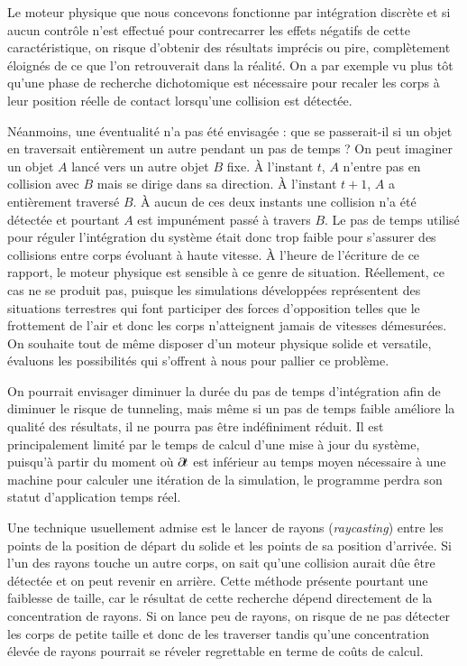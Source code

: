 Le moteur physique que nous concevons fonctionne par intégration
discrète et si aucun contrôle n'est effectué pour contrecarrer les
effets négatifs de cette caractéristique, on risque d'obtenir des
résultats imprécis ou pire, complètement éloignés de ce que l'on
retrouverait dans la réalité. On a par exemple vu plus tôt qu'une
phase de recherche dichotomique est nécessaire pour recaler les corps
à leur position réelle de contact lorsqu'une collision est détectée.

Néanmoins, une éventualité n'a pas été envisagée : que se passerait-il
si un objet en traversait entièrement un autre pendant un pas de temps
? On peut imaginer un objet $A$ lancé vers un autre objet $B$
fixe. \`A l'instant $t$, $A$ n'entre pas en collision avec $B$ mais se
dirige dans sa direction. \`A l'instant $t+1$, $A$ a entièrement
traversé $B$. \`A aucun de ces deux instants une collision n'a été
détectée et pourtant $A$ est impunément passé à travers $B$. Le pas de
temps utilisé pour réguler l'intégration du système était donc trop
faible pour s'assurer des collisions entre corps évoluant à haute
vitesse. \`A l'heure de l'écriture de ce rapport, le moteur physique
est sensible à ce genre de situation. Réellement, ce cas ne se produit
pas, puisque les simulations développées représentent des situations
terrestres qui font participer des forces d'opposition telles que le
frottement de l'air et donc les corps n'atteignent jamais de vitesses
démesurées. On souhaite tout de même disposer d'un moteur physique
solide et versatile, évaluons les possibilités qui s'offrent à nous
pour pallier ce problème.

\begin{figure}
  \centering
  
  \caption{}
  \label{tunneling1}
\end{figure}

On pourrait envisager diminuer la durée du pas de temps d'intégration
afin de diminuer le risque de tunneling, mais même si un pas de temps
faible améliore la qualité des résultats, il ne pourra pas être
indéfiniment réduit. Il est principalement limité par le temps de
calcul d'une mise à jour du système, puisqu'à partir du moment o\`u
$\partial \! t$ est inférieur au temps moyen nécessaire à une machine pour
calculer une itération de la simulation, le programme perdra son
statut d'application temps réel.

Une technique usuellement admise est le lancer de rayons
(\textit{raycasting}) entre les points de la position de départ du
solide et les points de sa position d'arrivée. Si l'un des rayons
touche un autre corps, on sait qu'une collision aurait dûe être
détectée et on peut revenir en arrière. Cette méthode présente
pourtant une faiblesse de taille, car le résultat de cette recherche
dépend directement de la concentration de rayons. Si on lance peu de
rayons, on risque de ne pas détecter les corps de petite taille et
donc de les traverser tandis qu'une concentration élevée de rayons
pourrait se réveler regrettable en terme de coûts de calcul.

